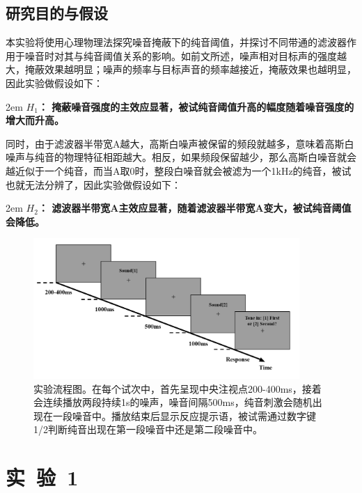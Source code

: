 \documentclass[jou,12pt,floatsintext]{apa7} %
\begin{document}
\subsection{\heiti 研究目的与假设}
\vspace{-1em}

本实验将使用心理物理法探究噪音掩蔽下的纯音阈值，并探讨不同带通的滤波器作用于噪音时对其与纯音阈值关系的影响。如前文所述，噪声相对目标声的强度越大，掩蔽效果越明显；噪声的频率与目标声音的频率越接近，掩蔽效果也越明显，因此实验做假设如下：

\vspace{0.5em}
\noindent 
{} 
\hangindent 2em \textbf{\(H_1\)： 掩蔽噪音强度的主效应显著，被试纯音阈值升高的幅度随着噪音强度的增大而升高。}
\vspace{0.5em}

同时，由于滤波器半带宽A越大，高斯白噪声被保留的频段就越多，意味着高斯白噪声与纯音的物理特征相距越大。相反，如果频段保留越少，那么高斯白噪音就会越近似于一个纯音，而当A取0时，整段白噪音就会被滤为一个1kHz的纯音，被试也就无法分辨了，因此实验做假设如下：

\vspace{0.5em}
\noindent 
{} 
\hangindent 2em \textbf{\(H_2\)： 滤波器半带宽A主效应显著，随着滤波器半带宽A变大，被试纯音阈值会降低。}


\begin{figure}[!hbt]
    \centering
    \includegraphics[width=0.9\textwidth]{figure/流程图.png}
    \captionsetup{labelsep=period}
    \caption{\small \rm 实验流程图。在每个试次中，首先呈现中央注视点200-400ms，接着会连续播放两段持续1s的噪声，噪音间隔500ms，纯音刺激会随机出现在一段噪音中。播放结束后显示反应提示语，被试需通过数字键1/2判断纯音出现在第一段噪音中还是第二段噪音中。}
    \label{fig:procedure}
\end{figure}

\section{实\ 验\ 1}
\end{document}
